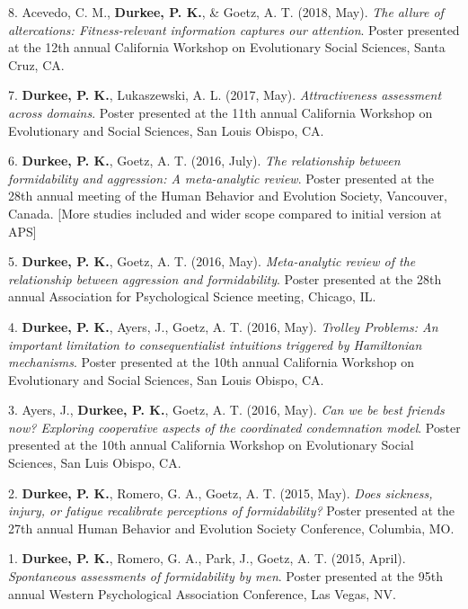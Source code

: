 \documentclass[10pt,]{article}
\begin{document}
8. \hangindent=0.5in Acevedo, C.
M.\textsuperscript{\faChevronCircleDown}, \textbf{Durkee, P. K.}, \&
Goetz, A. T. (2018, May). \emph{The allure of altercations:
Fitness-relevant information captures our attention}. Poster presented
at the 12th annual California Workshop on Evolutionary Social Sciences,
Santa Cruz, CA.

7. \hangindent=0.5in \textbf{Durkee, P. K.}, Lukaszewski, A. L. (2017,
May). \emph{Attractiveness assessment across domains}. Poster presented
at the 11th annual California Workshop on Evolutionary and Social
Sciences, San Louis Obispo, CA.

6. \hangindent=0.5in \textbf{Durkee, P. K.}, Goetz, A. T. (2016, July).
\emph{The relationship between formidability and aggression: A
meta-analytic review}. Poster presented at the 28th annual meeting of
the Human Behavior and Evolution Society, Vancouver, Canada. {[}More
studies included and wider scope compared to initial version at APS{]}

5. \hangindent=0.5in \textbf{Durkee, P. K.}, Goetz, A. T. (2016, May).
\emph{Meta-analytic review of the relationship between aggression and
formidability}. Poster presented at the 28th annual Association for
Psychological Science meeting, Chicago, IL.

4. \hangindent=0.5in \textbf{Durkee, P. K.}, Ayers, J., Goetz, A. T.
(2016, May). \emph{Trolley Problems: An important limitation to
consequentialist intuitions triggered by Hamiltonian mechanisms}. Poster
presented at the 10th annual California Workshop on Evolutionary and
Social Sciences, San Louis Obispo, CA.

3. \hangindent=0.5in Ayers, J., \textbf{Durkee, P. K.}, Goetz, A. T.
(2016, May). \emph{Can we be best friends now? Exploring cooperative
aspects of the coordinated condemnation model}. Poster presented at the
10th annual California Workshop on Evolutionary Social Sciences, San
Luis Obispo, CA.

2. \hangindent=0.5in \textbf{Durkee, P. K.}, Romero, G. A., Goetz, A. T.
(2015, May). \emph{Does sickness, injury, or fatigue recalibrate
perceptions of formidability?} Poster presented at the 27th annual Human
Behavior and Evolution Society Conference, Columbia, MO.

1. \hangindent=0.5in \textbf{Durkee, P. K.}, Romero, G. A., Park, J.,
Goetz, A. T. (2015, April). \emph{Spontaneous assessments of
formidability by men}. Poster presented at the 95th annual Western
Psychological Association Conference, Las Vegas, NV.
\end{document}
